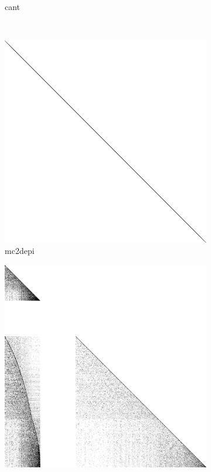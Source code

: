 \begin{figure}
\begin{multicols}{4}
\begin{subfigure}{\linewidth}
\caption{cant}
\end{subfigure}~%
\begin{subfigure}{\linewidth}
    \includegraphics[width=\linewidth]{images/mc2depi}
    \caption{mc2depi}
\end{subfigure}
\end{multicols}
\begin{multicols}{4}
\begin{subfigure}{\linewidth}
\includegraphics[width=\linewidth]{images/cop20k_A}

\end{subfigure}
\end{multicols}
\end{figure}
